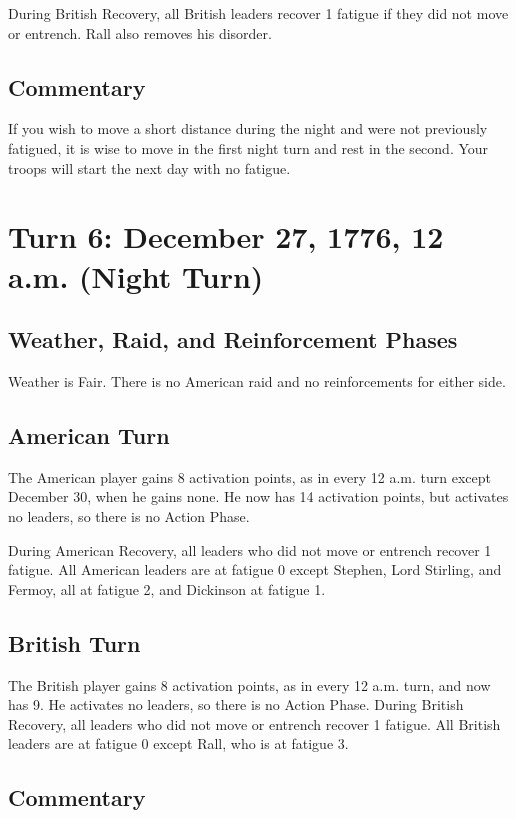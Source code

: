 \documentclass[11pt]{article}
\begin{document}
During British Recovery, all British leaders recover 1 fatigue if they did not move or entrench. Rall also removes his disorder.

\subsection{Commentary}

If you wish to move a short distance during the night and were not previously fatigued, it is wise to move in the first night turn and rest in the second. Your troops will start the next day with no fatigue.

\clearpage
\section{Turn 6: December 27, 1776, 12 a.m. (Night Turn)}

\subsection{Weather, Raid, and Reinforcement Phases}

Weather is Fair. There is no American raid and no reinforcements for either side.

\subsection{American Turn}

The American player gains 8 activation points, as in every 12 a.m. turn except December 30, when he gains none. He now has 14 activation points, but activates no leaders, so there is no Action Phase.

During American Recovery, all leaders who did not move or entrench recover 1 fatigue. All American leaders are at fatigue 0 except Stephen, Lord Stirling, and Fermoy, all at fatigue 2, and Dickinson at fatigue 1.

\subsection{British Turn}

The British player gains 8 activation points, as in every 12 a.m. turn, and now has 9. He activates no leaders, so there is no Action Phase. During British Recovery, all leaders who did not move or entrench recover 1 fatigue. All British leaders are at fatigue 0 except Rall, who is at fatigue 3.

\subsection{Commentary}
\end{document}
